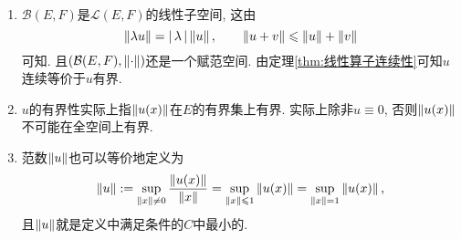 	\begin{Remark}~
	\begin{enumerate}[(1)]
	\item $ \mathcal B(E,F) $是$ \mathcal L(E,F) $的线性子空间, 这由
	\[
	\left\| \lambda u \right\|=\left| \,\lambda\, \right| \left\| u \right\|,\qquad \left\| u+v \right\|\leqslant\left\| u \right\|+\left\| v \right\|
	\]
	可知. 且$ (\mathcal{B}(E,F),\left\| \cdot \right\|) $还是一个赋范空间. 由定理\ref{thm:线性算子连续性}可知$ u $连续等价于$ u $有界.
	
	\item $ u $的有界性实际上指$ \left\| u(x) \right\| $在$ E $的有界集上有界. 实际上除非$ u\equiv 0 $, 否则$ \left\| u(x) \right\| $不可能在全空间上有界.
	
	\item 范数$ \left\| u \right\| $也可以等价地定义为
	\[
	\left\| u \right\|:=\sup_{\left\| x \right\|\ne 0}\frac{\left\| u(x) \right\|}{\left\| x \right\|}=\sup_{\left\| x \right\|\leqslant 1}\left\| u(x) \right\|=\sup_{\left\| x \right\|=1}\left\| u(x) \right\|,
	\]
	且$ \left\| u \right\| $就是定义中满足条件的$ C $中最小的.
	\end{enumerate}
	\end{Remark}